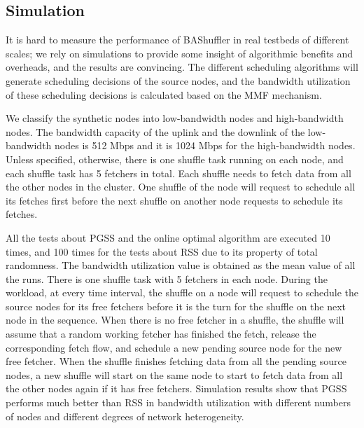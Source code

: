 \documentclass[10pt,journal,compsoc]{IEEEtran}
\begin{document}
\subsection{Simulation}
It is hard to measure the performance of BAShuffler in real
testbeds of different scales; we rely on
simulations to provide some insight of algorithmic benefits and
overheads, and the results are convincing.  %
The different scheduling algorithms will generate scheduling decisions
of the source nodes,
and the bandwidth utilization of these scheduling
decisions is calculated based on the MMF mechanism.

We classify the synthetic nodes into low-bandwidth nodes and
high-bandwidth nodes.
The bandwidth capacity of the uplink and the downlink of the
low-bandwidth nodes is 512 Mbps %
and it is 1024 Mbps for the high-bandwidth nodes. Unless specified, 
otherwise, there is one shuffle task running on each node, 
and each shuffle task has 5 fetchers in total. Each shuffle needs to fetch data from all the other nodes in the cluster.
One shuffle of the node will request to schedule all its fetches first 
before the next shuffle on another node requests to schedule its fetches. 

All the tests about PGSS and the online optimal algorithm are executed
10 times, and 100 times for
the tests about RSS due to its property of total randomness.
The bandwidth utilization value is obtained as the mean value of all the runs.
There is one shuffle task with 5 fetchers in each node.  
During the workload, at every time interval, 
the shuffle on a node will request to schedule the source nodes for
its free fetchers
before it is the turn for the shuffle on the next node in the sequence.
When there is no free fetcher in a shuffle, the shuffle will assume
that a random working fetcher has finished the
fetch, release the corresponding fetch flow, and schedule a new pending
source node for the new free fetcher.
When the shuffle finishes fetching data from all the pending source
nodes, a new shuffle will start on the same node to start to fetch
data from all the other nodes again if it has free fetchers.
Simulation results show that PGSS performs much better than RSS
in bandwidth utilization
with different numbers of nodes and different degrees of network heterogeneity. 

\end{document}

